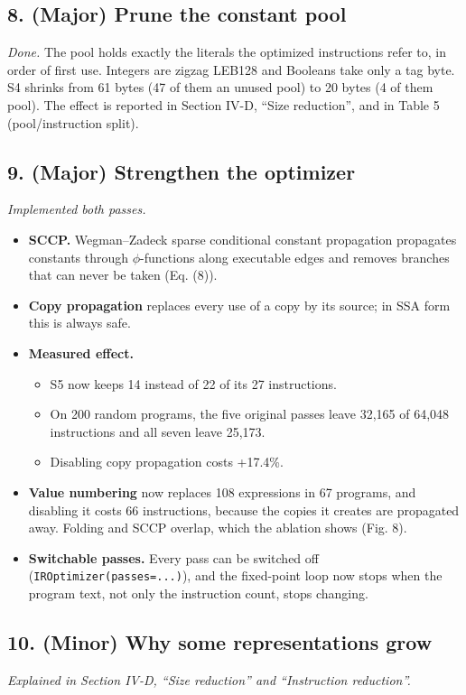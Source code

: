 \documentclass[11pt,a4paper]{article}
\begin{document}
\subsection*{8. (Major) Prune the constant pool}
\emph{Done.} The pool holds exactly the literals the optimized instructions refer to, in order of first use. Integers are zigzag LEB128 and Booleans take only a tag byte. S4 shrinks from 61 bytes (47 of them an unused pool) to 20 bytes (4 of them pool). The effect is reported in Section IV-D, ``Size reduction'', and in Table 5 (pool/instruction split).

\subsection*{9. (Major) Strengthen the optimizer}
\emph{Implemented both passes.}

\begin{itemize}
\item \textbf{SCCP.} Wegman--Zadeck sparse conditional constant propagation propagates constants through $\phi$-functions along executable edges and removes branches that can never be taken (Eq. (8)).
\item \textbf{Copy propagation} replaces every use of a copy by its source; in SSA form this is always safe.
\item \textbf{Measured effect.}
\begin{itemize}
\item S5 now keeps 14 instead of 22 of its 27 instructions.
\item On 200 random programs, the five original passes leave 32,165 of 64,048 instructions and all seven leave 25,173.
\item Disabling copy propagation costs +17.4\%.
\end{itemize}
\item \textbf{Value numbering} now replaces 108 expressions in 67 programs, and disabling it costs 66 instructions, because the copies it creates are propagated away. Folding and SCCP overlap, which the ablation shows (Fig. 8).
\item \textbf{Switchable passes.} Every pass can be switched off (\texttt{IROptimizer(passes=...)}), and the fixed-point loop now stops when the program text, not only the instruction count, stops changing.
\end{itemize}
\subsection*{10. (Minor) Why some representations grow}
\emph{Explained in Section IV-D, ``Size reduction'' and ``Instruction reduction''.}
\end{document}
